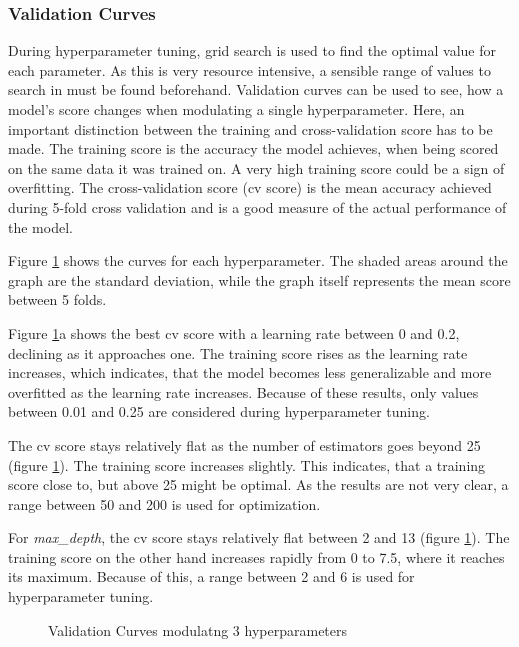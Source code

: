 \subsubsection{Validation Curves}

During hyperparameter tuning, grid search is used to find the optimal value for each parameter.
As this is very resource intensive, a sensible range of values to search in must be found beforehand.
Validation curves can be used to see, how a model's score changes when modulating a single hyperparameter.
Here, an important distinction between the training and cross-validation score has to be made.
The training score is the accuracy the model achieves, when being scored on the same data it was trained on.
A very high training score could be a sign of overfitting.
The cross-validation score (cv score) is the mean accuracy achieved during 5-fold cross validation and is a good measure
of the actual performance of the model.


Figure \ref{fig:Validation Curves modulating 3 hyperparameters} shows the curves for each hyperparameter. The shaded
areas around the graph are the standard deviation, while the graph itself represents the mean score between 5 folds.

Figure \ref{fig:Validation Curves modulating 3 hyperparameters}a shows the best cv score with a learning rate
between 0 and 0.2, declining as it approaches one.
The training score rises as the learning rate increases, which indicates, that the model becomes less generalizable and
more overfitted as the learning rate increases.
Because of these results, only values between 0.01 and 0.25 are considered during hyperparameter tuning.

The cv score stays relatively flat as the number of estimators goes beyond 25 (figure \ref{fig:Validation Curves modulating 3 hyperparameters}).
The training score increases slightly.
This indicates, that a training score close to, but above 25 might be optimal. As the results are not very clear,
a range between 50 and 200 is used for optimization.

For \emph{max\_depth}, the cv score stays relatively flat between 2 and 13 (figure \ref{fig:Validation Curves modulating 3 hyperparameters}).
The training score on the other hand increases rapidly from 0 to 7.5, where it reaches its maximum.
Because of this, a range between 2 and 6 is used for hyperparameter tuning.

\begin{figure}[H]
    \centering
    \qquad
    \qquad
    \caption{Validation Curves modulatng 3 hyperparameters}%
    \label{fig:Validation Curves modulating 3 hyperparameters}%
\end{figure}

